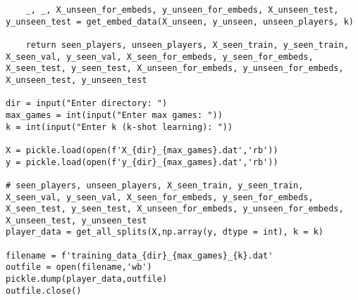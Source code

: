 \begin{verbatim}
    _, _, X_unseen_for_embeds, y_unseen_for_embeds, X_unseen_test, y_unseen_test = get_embed_data(X_unseen, y_unseen, unseen_players, k)  

    return seen_players, unseen_players, X_seen_train, y_seen_train, X_seen_val, y_seen_val, X_seen_for_embeds, y_seen_for_embeds, X_seen_test, y_seen_test, X_unseen_for_embeds, y_unseen_for_embeds, X_unseen_test, y_unseen_test

dir = input("Enter directory: ")
max_games = int(input("Enter max games: "))
k = int(input("Enter k (k-shot learning): "))

X = pickle.load(open(f'X_{dir}_{max_games}.dat','rb'))
y = pickle.load(open(f'y_{dir}_{max_games}.dat','rb'))

# seen_players, unseen_players, X_seen_train, y_seen_train, X_seen_val, y_seen_val, X_seen_for_embeds, y_seen_for_embeds, X_seen_test, y_seen_test, X_unseen_for_embeds, y_unseen_for_embeds, X_unseen_test, y_unseen_test
player_data = get_all_splits(X,np.array(y, dtype = int), k = k)

filename = f'training_data_{dir}_{max_games}_{k}.dat'
outfile = open(filename,'wb')
pickle.dump(player_data,outfile)
outfile.close()
\end{verbatim}

